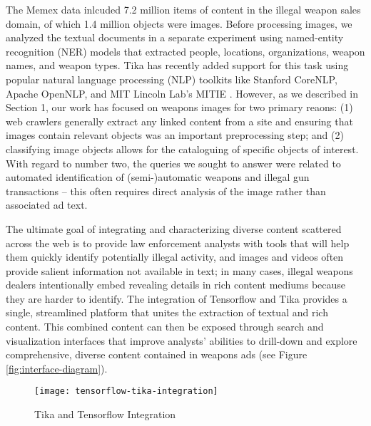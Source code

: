 The Memex data inlcuded 7.2 million items of content in the illegal weapon sales domain, of which 1.4 million objects were images. Before processing images, we analyzed the textual documents in a separate experiment using named-entity recognition (NER) models that extracted people, locations, organizations, weapon names, and weapon types. Tika has recently added support for this task using popular natural language processing (NLP) toolkits like Stanford CoreNLP\cite{Finkel:2005:INI:1219840.1219885}, Apache OpenNLP\cite{ApacheOpenNLP}, and MIT Lincoln Lab's MITIE \cite{MITIE-github}. However, as we described in Section 1, our work has focused on weapons images for two primary reaons: (1) web crawlers generally extract any linked content from a site and ensuring that images contain relevant objects was an important preprocessing step; and (2) classifying image objects allows for the cataloguing of specific objects of interest. 
With regard to number two, the queries we sought to answer were related to automated identification of (semi-)automatic weapons and illegal gun transactions -- this often requires direct analysis of the image rather than associated ad text. 

The ultimate goal of integrating and characterizing diverse content scattered across the web is to provide law enforcement analysts with tools that will help them quickly identify potentially illegal activity, and images and videos often provide salient information not available in text; in many cases, illegal weapons dealers intentionally embed revealing details in rich content mediums because they are harder to identify. The integration of Tensorflow and Tika provides a single, streamlined platform that unites the extraction of textual and rich content. This combined content can then be exposed through search and visualization interfaces that improve analysts' abilities to drill-down and explore comprehensive, diverse content contained in weapons ads (see Figure \ref{fig:interface-diagram}). 


\begin{figure*}[!t]
        \texttt{[image: tensorflow-tika-integration]}
        \caption{Tika and Tensorflow Integration}
        \label{fig:tf-tika-integration}
\end{figure*}

